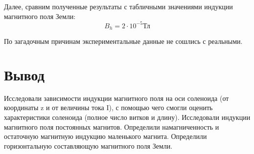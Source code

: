 \documentclass[a4paper]{article}
\begin{document}
	Далее, сравним полученные результаты с табличными значениями индукции магнитного поля Земли:
    	\[ B_{h} = 2 \cdot 10^{-5} \text{Тл}\]
        
   По загадочным причинам экспериментальные данные не сошлись с реальными.
\section{Вывод}
	Исследовали зависимости индукции магнитного поля на оси соленоида (от координаты z и от величины тока  I), с помощью чего смогли оценить характеристики соленоида (полное число витков и длину). Исследовали индукции магнитного поля постоянных магнитов. Определили намагниченность и остаточную магнитную индукцию маленького магнита. Определили горизонтальную составляющую магнитного поля Земли.
\end{document}
